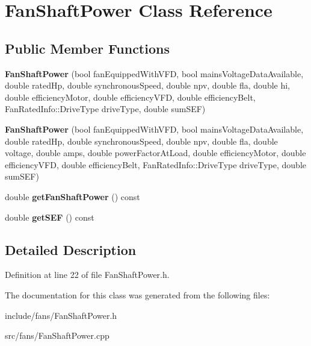 \hypertarget{class_fan_shaft_power}{}\section{Fan\+Shaft\+Power Class Reference}
\label{class_fan_shaft_power}
\subsection*{Public Member Functions}
\begin{DoxyCompactItemize}
\item 
\mbox{\label{class_fan_shaft_power_a7ba1098a51b5f118ddbcc024e18a8e8b}} 
{\bfseries Fan\+Shaft\+Power} (bool fan\+Equipped\+With\+V\+FD, bool mains\+Voltage\+Data\+Available, double rated\+Hp, double synchronous\+Speed, double npv, double fla, double hi, double efficiency\+Motor, double efficiency\+V\+FD, double efficiency\+Belt, Fan\+Rated\+Info\+::\+Drive\+Type drive\+Type, double sum\+S\+EF)
\item 
\mbox{\label{class_fan_shaft_power_a4c94a689955602eedd66046a3fcff730}} 
{\bfseries Fan\+Shaft\+Power} (bool fan\+Equipped\+With\+V\+FD, bool mains\+Voltage\+Data\+Available, double rated\+Hp, double synchronous\+Speed, double npv, double fla, double voltage, double amps, double power\+Factor\+At\+Load, double efficiency\+Motor, double efficiency\+V\+FD, double efficiency\+Belt, Fan\+Rated\+Info\+::\+Drive\+Type drive\+Type, double sum\+S\+EF)
\item 
\mbox{\label{class_fan_shaft_power_a755745b0206e0a957168f6399a4ac438}} 
double {\bfseries get\+Fan\+Shaft\+Power} () const
\item 
\mbox{\label{class_fan_shaft_power_a7a36d22c2301d3c634fc89e103daa148}} 
double {\bfseries get\+S\+EF} () const
\end{DoxyCompactItemize}


\subsection{Detailed Description}


Definition at line 22 of file Fan\+Shaft\+Power.\+h.



The documentation for this class was generated from the following files\+:\begin{DoxyCompactItemize}
\item 
include/fans/Fan\+Shaft\+Power.\+h\item 
src/fans/Fan\+Shaft\+Power.\+cpp\end{DoxyCompactItemize}
